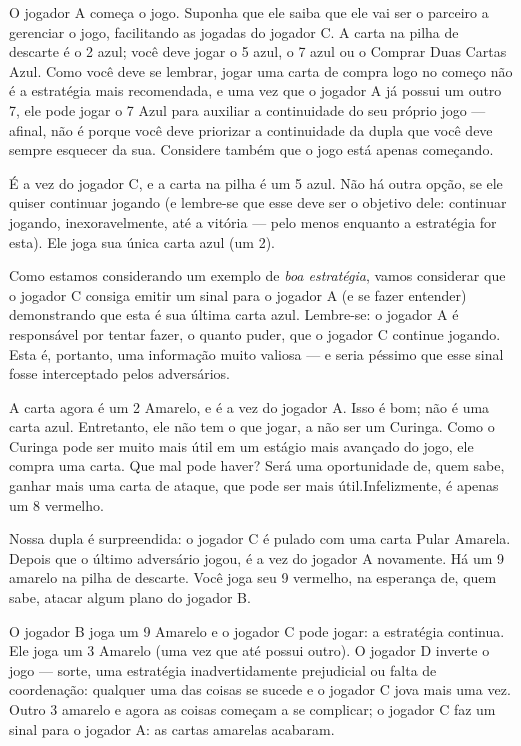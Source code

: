 O jogador A começa o jogo. Suponha que ele saiba que ele vai ser o parceiro a gerenciar o jogo, facilitando as jogadas do jogador C. A carta na pilha de descarte é o 2 azul; você deve jogar o 5 azul, o 7 azul ou o Comprar Duas Cartas Azul. Como você deve se lembrar, jogar uma carta de compra logo no começo não é a estratégia mais recomendada, e uma vez que o jogador A já possui um outro 7, ele pode jogar o 7 Azul para auxiliar a continuidade do seu próprio jogo --- afinal, não é porque você deve priorizar a continuidade da dupla que você deve sempre esquecer da sua. Considere também que o jogo está apenas começando.

É a vez do jogador C, e a carta na pilha é um 5 azul. Não há outra opção, se ele quiser continuar jogando (e lembre-se que esse deve ser o objetivo dele: continuar jogando, inexoravelmente, até a vitória --- pelo menos enquanto a estratégia for esta). Ele joga sua única carta azul (um 2).

Como estamos considerando um exemplo de \emph{boa estratégia}, vamos considerar que o jogador C consiga emitir um sinal para o jogador A (e se fazer entender) demonstrando que esta é sua última carta azul. Lembre-se: o jogador A é responsável por tentar fazer, o quanto puder, que o jogador C continue jogando. Esta é, portanto, uma informação muito valiosa --- e seria péssimo que esse sinal fosse interceptado pelos adversários.

A carta agora é um 2 Amarelo, e é a vez do jogador A. Isso é bom; não é uma carta azul. Entretanto, ele não tem o que jogar, a não ser um Curinga. Como o Curinga pode ser muito mais útil em um estágio mais avançado do jogo, ele compra uma carta. Que mal pode haver? Será uma oportunidade de, quem sabe, ganhar mais uma carta de ataque, que pode ser mais útil.Infelizmente, é apenas um 8 vermelho.

Nossa dupla é surpreendida: o jogador C é pulado com uma carta Pular Amarela. Depois que o último adversário jogou, é a vez do jogador A novamente. Há um 9 amarelo na pilha de descarte. Você joga seu 9 vermelho, na esperança de, quem sabe, atacar algum plano do jogador B.

O jogador B joga um 9 Amarelo e o jogador C pode jogar: a estratégia continua. Ele joga um 3 Amarelo (uma vez que até possui outro). O jogador D inverte o jogo --- sorte, uma estratégia inadvertidamente prejudicial ou falta de coordenação: qualquer uma das coisas se sucede e o jogador C jova mais uma vez. Outro 3 amarelo e agora as coisas começam a se complicar; o jogador C faz um sinal para o jogador A: as cartas amarelas acabaram.


